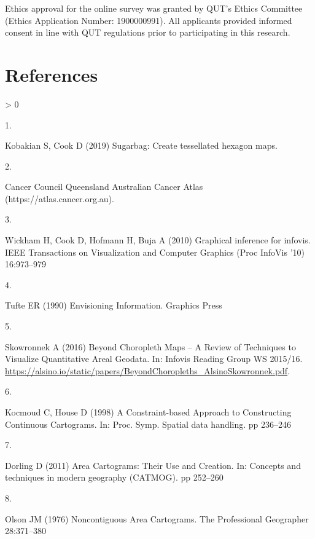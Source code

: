 \documentclass[conference,final,]{IEEEtran}
\newlength{\csllabelwidth}
\newlength{\cslhangindent}
\newenvironment{CSLReferences}[3] %
 {%
  \setlength{\parindent}{0pt}
  \ifodd #1 \everypar{\setlength{\hangindent}{\cslhangindent}}\ignorespaces\fi
  \ifnum #2 > 0
  \setlength{\parskip}{#3\baselineskip}
  \fi
 }%
 {}
\newcommand{\CSLLeftMargin}[1]{\parbox[t]{\maxof{\widthof{#1}}{\csllabelwidth}}{#1}}
\newcommand{\CSLRightInline}[1]{\parbox[t]{\linewidth}{#1}}
\begin{document}
Ethics approval for the online survey was granted by QUT's Ethics Committee (Ethics Application Number: 1900000991). All applicants provided informed consent in line with QUT regulations prior to participating in this research.

\newpage

\hypertarget{references}{%
\section*{References}\label{references}}

\hypertarget{refs}{}
\begin{CSLReferences}{0}{0}
\leavevmode\hypertarget{ref-sugarbag}{}%
\CSLLeftMargin{1. }
\CSLRightInline{Kobakian S, Cook D (2019) Sugarbag: Create tessellated hexagon maps. }

\leavevmode\hypertarget{ref-atlas}{}%
\CSLLeftMargin{2. }
\CSLRightInline{Cancer Council Queensland {Australian Cancer Atlas (https://atlas.cancer.org.au)}. }

\leavevmode\hypertarget{ref-GIIV}{}%
\CSLLeftMargin{3. }
\CSLRightInline{Wickham H, Cook D, Hofmann H, Buja A (2010) Graphical inference for infovis. IEEE Transactions on Visualization and Computer Graphics (Proc InfoVis '10) 16:973--979}

\leavevmode\hypertarget{ref-EI}{}%
\CSLLeftMargin{4. }
\CSLRightInline{Tufte ER (1990) {Envisioning Information}. Graphics Press}

\leavevmode\hypertarget{ref-BCM}{}%
\CSLLeftMargin{5. }
\CSLRightInline{Skowronnek A (2016) {Beyond Choropleth Maps -- A Review of Techniques to Visualize Quantitative Areal Geodata}. In: {Infovis Reading Group WS 2015/16}. \url{https://alsino.io/static/papers/BeyondChoropleths_AlsinoSkowronnek.pdf}. }

\leavevmode\hypertarget{ref-CBATCC}{}%
\CSLLeftMargin{6. }
\CSLRightInline{Kocmoud C, House D (1998) {A Constraint-based Approach to Constructing Continuous Cartograms}. In: Proc. Symp. Spatial data handling. pp 236--246}

\leavevmode\hypertarget{ref-ACTUC}{}%
\CSLLeftMargin{7. }
\CSLRightInline{Dorling D (2011) {Area Cartograms: Their Use and Creation}. In: Concepts and techniques in modern geography (CATMOG). pp 252--260}

\leavevmode\hypertarget{ref-NAC}{}%
\CSLLeftMargin{8. }
\CSLRightInline{Olson JM (1976) {Noncontiguous Area Cartograms}. The Professional Geographer 28:371--380}


\end{CSLReferences}
\end{document}
